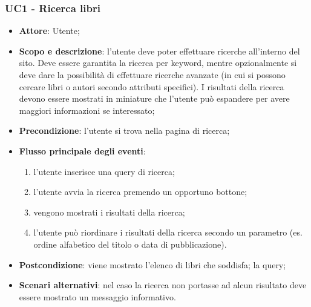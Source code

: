 \subsubsection{UC1 - Ricerca libri}
\begin{itemize}
	\item \textbf{Attore}: Utente;
	\item \textbf{Scopo e descrizione}: l'utente deve poter effettuare ricerche all'interno del sito. Deve essere garantita la ricerca per keyword, mentre opzionalmente si deve dare la possibilità di effettuare ricerche avanzate (in cui si possono cercare libri  o autori secondo attributi specifici). I risultati della ricerca devono essere mostrati in miniature che l'utente può espandere per avere maggiori informazioni se interessato;
	\item \textbf{Precondizione}: l'utente si trova nella pagina di ricerca;
	\item \textbf{Flusso principale degli eventi}:
	\begin{enumerate}
		\item l'utente inserisce una query di ricerca;
		\item l'utente avvia la ricerca premendo un opportuno bottone;
		\item vengono mostrati i risultati della ricerca;
		\item l'utente può riordinare i risultati della ricerca secondo un parametro (es. ordine alfabetico del titolo o data di pubblicazione).
	\end{enumerate} 
	\item \textbf{Postcondizione}: viene mostrato l'elenco di libri che soddisfa; la query;
	\item \textbf{Scenari alternativi}: nel caso la ricerca non portasse ad alcun risultato deve essere mostrato un messaggio informativo.
\end{itemize}

